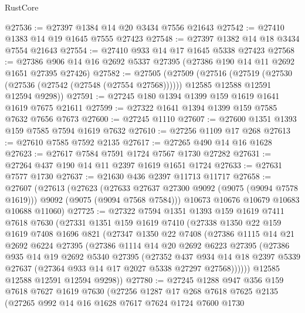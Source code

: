 \begin{lexlean}{RustCore}
\begin{coremodule}
@27536 := @27397 @1384 @14 @20 @3434 @7556 @21643
@27542 := @27410 @1383 @14 @19 @1645 @7555 @27423
@27548 := @27397 @1382 @14 @18 @3434 @7554 @21643
@27554 := @27410 @933 @14 @17 @1645 @5338 @27423
@27568 := @27386 @906 @14 @16 @2692 @5337 @27395 (@27386 @190 @14 @11 @2692 @1651 @27395 @27426)
@27582 := @27505
    (@27509
      (@27516
        (@27519 (@27530 (@27536 (@27542 (@27548 (@27554 @27568))))))
        @12585
        @12588
        @12591
        @12594
        @9298))
@27591 := @27245 @180 @1394 @1399 @159 @1619 @1641 @1619 @7675 @21611
@27599 := @27322 @1641 @1394 @1399 @159 @7585 @7632 @7656 @7673
@27600 := @27245 @1110
@27607 := @27600 @1351 @1393 @159 @7585 @7594 @1619 @7632
@27610 := @27256 @1109 @17 @268
@27613 := @27610 @7585 @7592 @2135
@27617 := @27265 @490 @14 @16 @1628
@27623 := @27617 @7584 @7591 @1724 @7567 @1730 @27282
@27631 := @27264 @437 @190 @14 @11 @2397 @1619 @1651 @1724
@27633 := @27631 @7577 @1730
@27637 := @21630 @436 @2397 @11713 @11717
@27658 := @27607
    (@27613
      (@27623
        (@27633 @27637 @27300 @9092 (@9075 (@9094 @7578 @1619)))
        @9092
        (@9075 (@9094 @7568 @7584)))
      @10673
      @10676
      @10679
      @10683
      @10688
      @11060)
@27725 := @27322
    @7594
    @1351
    @1393
    @159
    @1619
    @7411
    @7618
    @7630
    (@27331
      @1351
      @159
      @1619
      @7410
      (@27338
        @1350
        @22
        @159
        @1619
        @7408
        @1696
        @821
        (@27347
          @1350
          @22
          @7408
          (@27386
            @1115
            @14
            @21
            @2692
            @6224
            @27395
            (@27386
              @1114
              @14
              @20
              @2692
              @6223
              @27395
              (@27386
                @935
                @14
                @19
                @2692
                @5340
                @27395
                (@27352
                  @437
                  @934
                  @14
                  @18
                  @2397
                  @5339
                  @27637
                  (@27364 @933 @14 @17 @2027 @5338 @27297 @27568))))))
        @12585
        @12588
        @12591
        @12594
        @9298))
@27780 := @27245
    @1288
    @947
    @356
    @159
    @7618
    @7627
    @1619
    @7630
    (@27256
      @1287
      @17
      @268
      @7618
      @7625
      @2135
      (@27265
        @992
        @14
        @16
        @1628
        @7617
        @7624
        @1724
        @7600
        @1730

\end{coremodule}
\end{lexlean}
